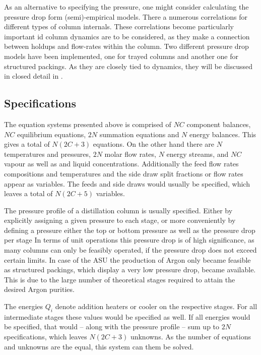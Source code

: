        As an alternative to specifying the pressure, one might consider calculating the pressure drop
        form (semi)-empirical models. There a numerous correlations for different types of column internals.
        These correlations become particularly important id column dynamics are to be considered, as they
        make a connection between holdups and flow-rates within the column. Two different pressure drop models
        have been implemented, one for trayed columns and another one for structured packings. As they are closely
        tied to dynamics, they will be discussed in closed detail in .

    \subsection{Specifications}
        The equation systems presented above is comprised of $NC$ component balances, $NC$ equilibrium
        equations, $2N$ summation equations and $N$ energy balances. This gives a total of $N (2C + 3)$
        equations. On the other hand there are $N$ temperatures and pressures, $2N$ molar flow rates,
        $N$ energy streams, and $NC$ vapour as well as and liquid concentrations. Additionally the feed flow rates
        compositions and temperatures and the side draw split fractions or flow rates appear as variables. The
        feeds and side draws would usually be specified, which leaves a total of $N (2C + 5)$ variables.

        The pressure profile of a distillation column is usually specified. Either by explicitly
        assigning a given pressure to each stage, or more conveniently by defining a pressure
        either the top or bottom pressure as well as the pressure drop per stage
        In terms of unit operations this pressure drop is of high significance,
        as many columns can only be feasibly operated, if the pressure drop does not exceed certain
        limits. In case of the ASU the production of Argon only became feasible as structured
        packings, which display a very low pressure drop, became available. This is due to the large
        number of theoretical stages required to attain the desired Argon purities.

        The energies $Q_i$ denote addition heaters or cooler on the respective stages. For all
        intermediate stages these values would be specified as well. If all energies would be
        specified, that would -- along with the pressure profile -- sum up to $2N$ specifications,
        which leaves $N (2C + 3)$ unknowns. As the number of equations and unknowns are the equal,
        this system can them be solved.


